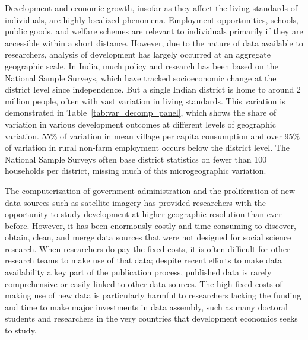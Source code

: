 \documentclass[12pt,letterpaper]{article}
\begin{document}
Development and economic growth, insofar as they affect the living
standards of individuals, are highly localized phenomena. Employment
opportunities, schools, public goods, and welfare schemes are relevant
to individuals primarily if they are accessible within a short
distance. However, due to the nature of data available to researchers,
analysis of development has largely occurred at an aggregate
geographic scale. In India, much policy and research has been based on
the National Sample Surveys, which have tracked socioeconomic change
at the district level since independence. But a single Indian district
is home to around 2 million people, often with vast variation in
living standards. This variation is demonstrated in
Table~\ref{tab:var_decomp_panel}, which shows the share of variation
in various development outcomes at different levels of geographic
variation. 55\% of variation in mean village per capita consumption
and over 95\% of variation in rural non-farm employment occurs below
the district level. The National Sample Surveys often base district
statistics on fewer than 100 households per district, missing much of
this microgeographic variation. 

The computerization of government administration and the proliferation
of new data sources such as satellite imagery has provided researchers
with the opportunity to study development at higher geographic
resolution than ever before. However, it has been enormously costly
and time-consuming to discover, obtain, clean, and merge data sources
that were not designed for social science research. When researchers
do pay the fixed costs, it is often difficult for other research teams
to make use of that data; despite recent efforts to make data
availability a key part of the publication process, published data is
rarely comprehensive or easily linked to other data sources. The high
fixed costs of making use of new data is particularly harmful to
researchers lacking the funding and time to make major investments in
data assembly, such as many doctoral students and researchers in the
very countries that development economics seeks to study.
\end{document}
